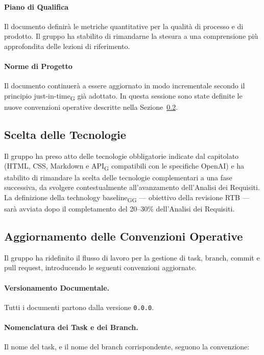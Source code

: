 \paragraph{Piano di Qualifica}
Il documento definirà le metriche quantitative per la qualità di processo
e di prodotto. Il gruppo ha stabilito di rimandarne la stesura a una
comprensione più approfondita delle lezioni di riferimento.

\paragraph{Norme di Progetto}
Il documento continuerà a essere aggiornato in modo incrementale secondo
il principio just-in-time\textsubscript{G} già adottato. In questa sessione sono state
definite le nuove convenzioni operative descritte nella
Sezione~\ref{sec:convenzioni}.

\subsection{Scelta delle Tecnologie}
\label{sec:tecnologie}

Il gruppo ha preso atto delle tecnologie obbligatorie indicate dal capitolato
(HTML, CSS, Markdown e API\textsubscript{G} compatibili con le specifiche OpenAI) e ha
stabilito di rimandare la scelta delle tecnologie complementari a una fase
successiva, da svolgere contestualmente all'avanzamento dell'Analisi dei
Requisiti. La definizione della technology baseline\textsubscript{G}\textsubscript{G} — obiettivo della
revisione RTB — sarà avviata dopo il completamento del 20--30\% dell'Analisi
dei Requisiti.
 
\subsection{Aggiornamento delle Convenzioni Operative}\label{sec:convenzioni}
 
Il gruppo ha ridefinito il flusso di lavoro per la gestione di task, branch,
commit e pull request, introducendo le seguenti convenzioni aggiornate.
 
\paragraph{Versionamento Documentale.}
Tutti i documenti partono dalla versione \texttt{0.0.0}.
 
\paragraph{Nomenclatura dei Task e dei Branch.}
Il nome del task, e il nome del branch corrispondente, seguono la convenzione:
 
